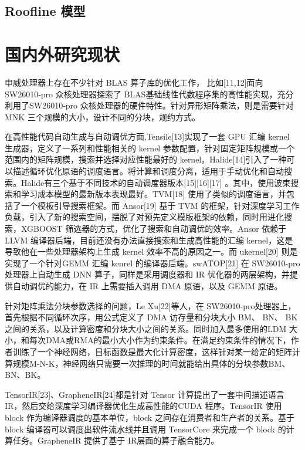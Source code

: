 \subsection{Roofline 模型}



\section{国内外研究现状}

申威处理器上存在不少针对 BLAS 算子库的优化工作， 比如[11,12]面向 SW26010-pro 众核处理器探索了 BLAS基础线性代数程序集的高性能实现，充分利用了SW26010-pro 众核处理器的硬件特性。针对异形矩阵乘法，则是需要针对 MNK 三个规模的大小，设计不同的分块，规约方式。

在高性能代码自动生成与自动调优方面,Tensile[13]实现了一套 GPU 汇编 kernel 生成器，定义了一系列和性能相关的 kernel 参数配置，针对固定矩阵规模或一个范围内的矩阵规模，搜索并选择对应性能最好的 kernel。Halide[14]引入了一种可以描述循环优化原语的调度语言。将计算和调度分离，适用于手动优化和自动搜索。Halide有三个基于不同技术的自动调度器版本[15][16][17] 。其中，使用波束搜索和学习成本模型的最新版本表现最好。TVM[18] 使用了类似的调度语言，并包括了一个模板引导搜索框架。而 Ansor[19] 基于 TVM 的框架，针对深度学习工作负载，引入了新的搜索空间，摆脱了对预先定义模版框架的依赖，同时用进化搜索，XGBOOST 筛选器的方式，优化了搜索和自动调优的效率。Ansor 依赖于 LLVM 编译器后端，目前还没有办法直接搜索和生成高性能的汇编 kernel，这是导致他在一些处理器架构上生成 kernel 效率不高的原因之一。而 ukernel[20] 则是实现了一个针对GEMM 汇编 kenrel 的编译器后端。swATOP[21] 在 SW26010-pro 处理器上自动生成 DNN 算子，同样是采用调度器和 IR 优化器的两层架构，并提供自动调优的能力，在 IR 上需要插入调用 DMA 原语，以及 GEMM 原语。

针对矩阵乘法分块参数选择的问题，Le Xu[22]等人，在 SW26010-pro处理器上，首先根据不同循环次序，用公式定义了 DMA 访存量和分块大小 BM、 BN、 BK 之间的关系，以及计算密度和分块大小之间的关系。同时加入最多使用的LDM 大小，和每次DMA或RMA的最小大小作为约束条件。在满足约束条件的情况下，作者训练了一个神经网络，目标函数是最大化计算密度，这样针对某一给定的矩阵计算规模M-N-K，神经网络只需要一次推理的时间就能给出具体的分块参数BM、BN、BK。

TensorIR[23]、GrapheneIR[24]都是针对 Tensor 计算提出了一套中间描述语言IR，然后交给深度学习编译器优化生成高性能的CUDA 程序。TensorIR 使用 block 作为编译器调度的基本单位，block 之间存在消费者和生产者的关系。基于 block 编译器可以调度出软件流水线并且调用 TensorCore 来完成一个 block 的计算任务。GrapheneIR 提供了基于 IR层面的算子融合能力。


